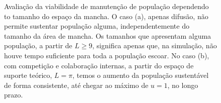 \documentclass{article}
\begin{document}
 	\begin{figure}[h]
 		\centering
 		\qquad
 		\caption{Avaliação da viabilidade de manutenção de população dependendo to tamanho do espaço da mancha. O caso (a), apenas difusão, não permite sustentar população alguma, independentemente do tamanho da área de mancha. Os tamanhos que apresentam alguma população, a partir de $L \geq 9$, significa apenas que, na simulação, não houve tempo suficiente para toda a população escoar. No caso (b), com competição e colaboração internas, a partir do espaço de suporte teórico, $L=\pi$, temos o aumento da população sustentável de forma consistente, até chegar ao máximo de $u = 1$, no longo prazo.}
 		\label{fig:Max-alpha0-beta0-D1}
 	\end{figure}
 
\end{document}
